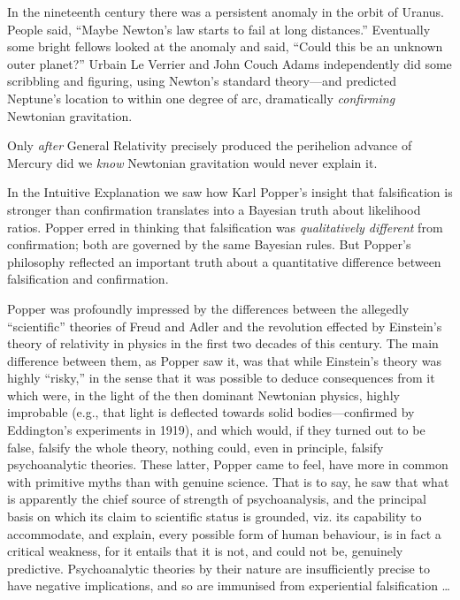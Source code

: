 {
 In the nineteenth century there was a persistent anomaly in the
orbit of Uranus. People said, ``Maybe
Newton's law starts to fail at long
distances.'' Eventually some bright fellows looked at
the anomaly and said, ``Could this be an unknown outer
planet?'' Urbain Le Verrier and John Couch Adams
independently did some scribbling and figuring, using
Newton's standard theory---and predicted
Neptune's location to within one degree of arc,
dramatically \textit{confirming} Newtonian
gravitation.}

{
 Only \textit{after} General Relativity precisely produced the
perihelion advance of Mercury did we \textit{know} Newtonian
gravitation would never explain it.}

{
 In the Intuitive Explanation we saw how Karl
Popper's insight that falsification is stronger than
confirmation translates into a Bayesian truth about likelihood ratios.
Popper erred in thinking that falsification was \textit{qualitatively
different} from confirmation; both are governed by the same Bayesian
rules. But Popper's philosophy reflected an important
truth about a quantitative difference between falsification and
confirmation.}

{
 Popper was profoundly impressed by the differences between the
allegedly ``scientific'' theories of
Freud and Adler and the revolution effected by
Einstein's theory of relativity in physics in the first
two decades of this century. The main difference between them, as
Popper saw it, was that while Einstein's theory was
highly ``risky,'' in the sense that
it was possible to deduce consequences from it which were, in the light
of the then dominant Newtonian physics, highly improbable (e.g., that
light is deflected towards solid bodies---confirmed by
Eddington's experiments in 1919), and which would, if
they turned out to be false, falsify the whole theory, nothing could,
even in principle, falsify psychoanalytic theories. These latter,
Popper came to feel, have more in common with primitive myths than with
genuine science. That is to say, he saw that what is apparently the
chief source of strength of psychoanalysis, and the principal basis on
which its claim to scientific status is grounded, viz. its capability
to accommodate, and explain, every possible form of human behaviour, is
in fact a critical weakness, for it entails that it is not, and could
not be, genuinely predictive. Psychoanalytic theories by their nature
are insufficiently precise to have negative implications, and so are
immunised from experiential falsification \ldots}

